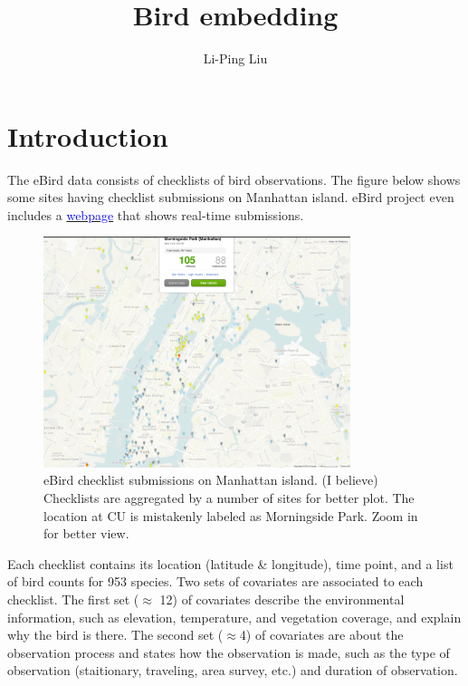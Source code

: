 \documentclass{article}
\title{Bird embedding}
\author{Li-Ping Liu}
\date{}
\begin{document}
\maketitle

\section{Introduction}

The eBird data consists of checklists of bird observations. The figure below shows some sites having checklist submissions on Manhattan island. eBird project even includes a \href{http://ebird.org/ebird/livesubs}{\textcolor{blue}{webpage}} that shows real-time submissions. 


\begin{figure}[h]
    \centering
    \includegraphics[width=0.8\textwidth]{figures/ebird-checklist-manhattan.png}
    \caption{eBird checklist submissions on Manhattan island. (I believe) Checklists are aggregated by a number of sites for better plot. The location at CU is mistakenly labeled as Morningside Park. Zoom in for better view. }
    \label{fig1}
\end{figure}


Each checklist contains its location (latitude \& longitude), time point, and a list of bird counts for 953 species. Two sets of covariates are associated to each checklist. The first set ($\approx$ 12) of covariates describe the environmental information, such as elevation, temperature, and vegetation coverage, and explain why the bird is there. The second set ($\approx$4) of covariates are about the observation process and states how the observation is made, such as the type of observation (staitionary, traveling, area survey, etc.) and duration of observation. 
\end{document}
